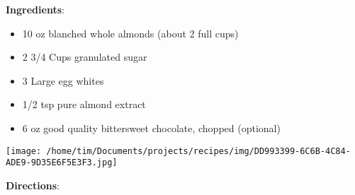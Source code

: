 \documentclass[11pt, twoside, openany]{book}
\begin{document}
\begin{minipage}[t]{0.8\linewidth}
\textbf{Ingredients}:\vspace{-3mm}
\begin{multicols}{2}
\begin{itemize}\setlength\itemsep{-1mm}
\item 10 oz blanched whole almonds (about 2 full cups)
\item 2 3/4 Cups granulated sugar
\item 3 Large egg whites
\item 1/2 tsp pure almond extract
\item 6 oz good quality bittersweet chocolate, chopped (optional)
\end{itemize}
\end{multicols}
\end{minipage}
\begin{minipage}[t]{0.2\linewidth}
\centering \strut\vspace*{-\baselineskip}\newline
\texttt{[image: /home/tim/Documents/projects/recipes/img/DD993399-6C6B-4C84-ADE9-9D35E6F5E3F3.jpg]}\\
\end{minipage}\vspace{3mm}
\textbf{Directions}:
\end{document}
